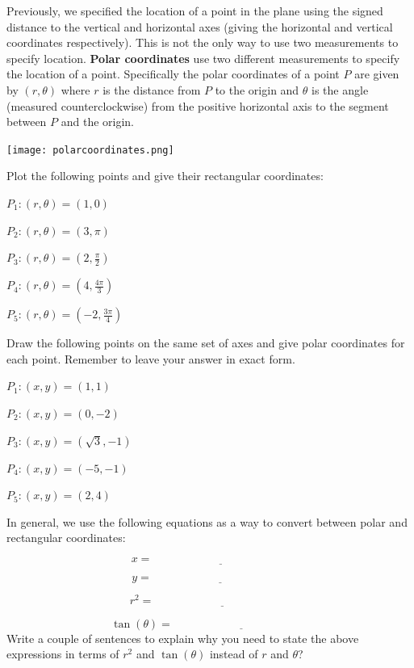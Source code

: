 \begin{info}
Previously, we specified the location of a point in the plane using the signed distance to the vertical and horizontal axes (giving the horizontal and vertical coordinates respectively). This is not the only way to use two measurements to specify location. \textbf{Polar coordinates} use two different measurements to specify the location of a point. Specifically the polar coordinates of a point $P$ are given by $(r,\theta)$ where $r$ is the distance from $P$ to the origin and $\theta$ is the angle (measured counterclockwise) from the positive horizontal axis to the segment between $P$ and the origin.

\begin{center} \texttt{[image: polarcoordinates.png]} \end{center}
\end{info}

\bq Plot the following points and give their rectangular coordinates:
\be
\item $P_1:(r, \theta)=(1,0) $
\item $P_2:(r, \theta)=(3,\pi)$
\item $P_3:(r, \theta)=(2,\frac{\pi}{2})$
\item $P_4:(r, \theta)=(4, \frac{4\pi}{3})$
\item $P_5:(r, \theta)=(-2, \frac{3 \pi}{4})$
\ee
\eq

\bq Draw the following points on the same set of axes and give polar coordinates for each point. Remember to leave your answer in exact form.
\be
\item $P_1:(x,y)=(1,1) $
\item $P_2:(x,y)=(0,-2)$
\item $P_3:(x,y)=(\sqrt{3}, -1)$
\item $P_4:(x,y)=(-5,-1)$
\item $P_5:(x,y)=(2,4)$
\ee
\eq

\bq In general, we use the following equations as a way to convert between polar and rectangular coordinates:

$$ x = \underline{\hspace{2in}} $$

$$ y = \underline{\hspace{2in}} $$

$$ r^2 = \underline{\hspace{2in}} $$

$$ \tan(\theta) = \underline{\hspace{2in}} $$
\eq
\bq
Write a couple of sentences to explain why you need to state the above expressions in terms of $r^2$ and $\tan(\theta)$ instead of $r$ and $\theta$?
\eq

